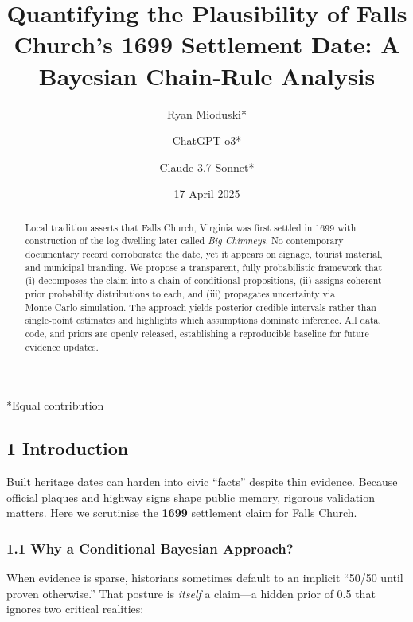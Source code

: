 \documentclass[
  11pt,
]{article}
\title{Quantifying the Plausibility of Falls Church's 1699 Settlement
Date: A Bayesian Chain‑Rule Analysis}
\author{Ryan Mioduski* \and ChatGPT‑o3* \and Claude-3.7-Sonnet*}
\date{17 April 2025}
\begin{document}
\maketitle
\begin{abstract}
Local tradition asserts that Falls Church, Virginia was first settled in
1699 with construction of the log dwelling later called \emph{Big
Chimneys}. No contemporary documentary record corroborates the date, yet
it appears on signage, tourist material, and municipal branding. We
propose a transparent, fully probabilistic framework that (i) decomposes
the claim into a chain of conditional propositions, (ii) assigns
coherent prior probability distributions to each, and (iii) propagates
uncertainty via Monte‑Carlo simulation. The approach yields posterior
credible intervals rather than single‑point estimates and highlights
which assumptions dominate inference. All data, code, and priors are
openly released, establishing a reproducible baseline for future
evidence updates.
\end{abstract}

*Equal contribution

\subsection{1 Introduction}\label{introduction}

Built heritage dates can harden into civic ``facts'' despite thin
evidence. Because official plaques and highway signs shape public
memory, rigorous validation matters. Here we scrutinise the
\textbf{1699} settlement claim for Falls Church.

\subsubsection{1.1 Why a Conditional Bayesian
Approach?}\label{why-a-conditional-bayesian-approach}

When evidence is sparse, historians sometimes default to an implicit
``50/50 until proven otherwise.'' That posture is \emph{itself} a
claim---a hidden prior of 0.5 that ignores two critical realities:
\end{document}
